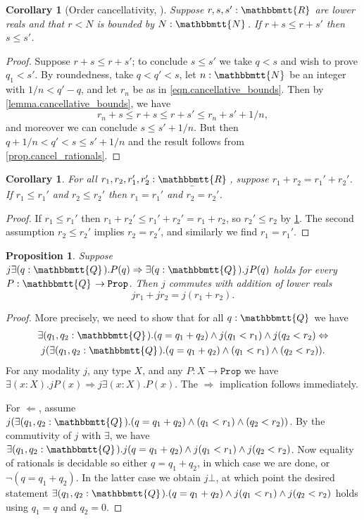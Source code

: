 \documentclass[11pt, oneside, article]{memoir}
\theoremstyle{plain}
\newtheorem{proposition}[theorem]{Proposition}
\newtheorem{corollary}[theorem]{Corollary}
\theoremstyle{definition}
\theoremstyle{remark}
\newcommand{\const}[1]{\mathtt{#1}}
\newcommand{\ubar}[1]{\underaccent{\bar}{#1}}
\newcommand{\internal}[1]{\raisebox{-.03ex}{$\mathbbmtt{#1}$}}
\newcommand{\hs}{\hspace{1.1pt}}
\newcommand{\tnn}{\internal{N}\hs}
\newcommand{\tqq}{\internal{Q}\hs}
\newcommand{\trr}{\internal{R}\hs}
\newcommand{\tlrr}{\ubar{\trr}\hs}
\newcommand{\prop}{\const{Prop}}
\newcommand{\imp}{\Rightarrow}
\renewcommand{\iff}{\Leftrightarrow}
\begin{document}
\begin{corollary}[Order cancellativity, \cite{henry2012simplification}]\label{cor.order_cancel}
Suppose $r,s,s':\trr$ are lower reals and that $r<N$ is bounded by $N:\tnn$. If $r+s\leq r+s'$ then $s\leq s'$.
\end{corollary}
\begin{proof}
Suppose $r+s\leq r+s'$; to conclude $s\leq s'$ we take $q<s$ and wish to prove $q_1<s'$. By roundedness, take $q<q'<s$, let $n:\tnn$ be an integer with $1/n<q'-q$, and let $r_n$ be as in \eqref{eqn.cancellative_bounds}. Then by \cref{lemma.cancellative_bounds}, we have 
\[r_n+s\leq r+s\leq r+s'\leq r_n+s'+1/n,\]
and moreover we can conclude $s\leq s'+1/n$. But then $q+1/n<q'<s\leq s'+1/n$ and the result follows from \cref{prop.cancel_rationals}.
\end{proof}

\begin{corollary}\label{cor.favorite}
For all $r_1,r_2,r_1',r_2':\tlrr$, suppose $r_1+r_2=r_1'+r_2'$. If $r_1\leq r_1'$ and $r_2\leq r_2'$ then $r_1=r_1'$ and $r_2=r_2'$.
\end{corollary}
\begin{proof}
If $r_1\leq r_1'$ then $r_1+r_2'\leq r_1'+r_2'=r_1+r_2$, so $r_2'\leq r_2$ by \cref{cor.order_cancel}. The second assumption $r_2\leq r_2'$ implies $r_2=r_2'$, and similarly we find $r_1=r_1'$.
\end{proof}

\begin{proposition}\label{prop.commute_exists_commute_addition}
Suppose $j\exists(q:\tqq).P(q)\imp \exists(q:\tqq).jP(q)$ holds for every $P:\tqq\to\prop$. Then $j$ commutes with addition of lower reals
\[
	jr_1+jr_2=j(r_1+r_2).
\]
\end{proposition}
\begin{proof}
More precisely, we need to show that for all $q:\tqq$ we have
\begin{multline*}
	\exists(q_1,q_2:\tqq).(q=q_1+q_2)\wedge j(q_1<r_1)\wedge j(q_2<r_2)\iff\\
	j(\exists(q_1,q_2:\tqq).(q=q_1+q_2)\wedge (q_1<r_1)\wedge(q_2<r_2)).
\end{multline*}
For any modality $j$, any type $X$, and any $P:X\to\prop$ we have $\exists(x:X).jP(x)\imp j\exists(x:X).P(x)$. The $\imp$ implication follows immediately.

For $\Leftarrow$, assume $j(\exists(q_1,q_2:\tqq).(q=q_1+q_2)\wedge (q_1<r_1)\wedge(q_2<r_2))$. By the commutivity of $j$ with $\exists$, we have $\exists(q_1,q_2:\tqq).j(q=q_1+q_2)\wedge j(q_1<r_1)\wedge j(q_2<r_2)$. Now equality of rationals is decidable so either $q=q_1+q_2$, in which case we are done, or $\neg(q=q_1+q_2)$. In the latter case we obtain $j\bot$, at which point the desired statement $\exists(q_1,q_2:\tqq).(q=q_1+q_2)\wedge j(q_1<r_1)\wedge j(q_2<r_2)$ holds using $q_1=q$ and $q_2=0$.
\end{proof}
\end{document}
